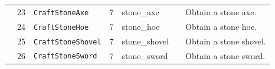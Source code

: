 \begin{table}[H]
{\begin{tabular}{@{}cclclcl@{}}
                      & 23  & \texttt{CraftStoneAxe}            & 7               & stone\_axe              &                         & Obtain a stone axe.             \\
                      & 24  & \texttt{CraftStoneHoe}            & 7               & stone\_hoe              &                         & Obtain a stone hoe.             \\
                      & 25  & \texttt{CraftStoneShovel}         & 7               & stone\_shovel           &                         & Obtain a stone shovel.          \\
                      & 26  & \texttt{CraftStoneSword}          & 7               & stone\_sword            &                         & Obtain a stone sword.            \\ \bottomrule
\end{tabular}}
\end{table}

